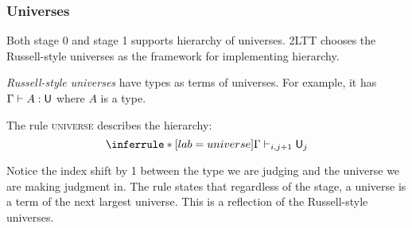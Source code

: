 

\subsubsection{Universes}
    Both stage 0 and stage 1 supports hierarchy of universes. 2LTT chooses the Russell-style universes as the framework for implementing hierarchy.

    
    \begin{definition}
        \emph{Russell-style universes} have types as terms of universes. For example, it has $\Gamma \vdash A : \mathsf{U}$ where $A$ is a type. %
    \end{definition}
    
    The rule \textsc{universe} describes the hierarchy:
    $$\inferrule*[lab=universe]
                 {\\}
                 {\Gamma \vdash_{i,j+1} \U_j}$$

    Notice the index shift by 1 between the type we are judging and the universe we are making judgment in. The rule states that regardless of the stage, a universe is a term of the next largest universe. This is a reflection of the Russell-style universes.


